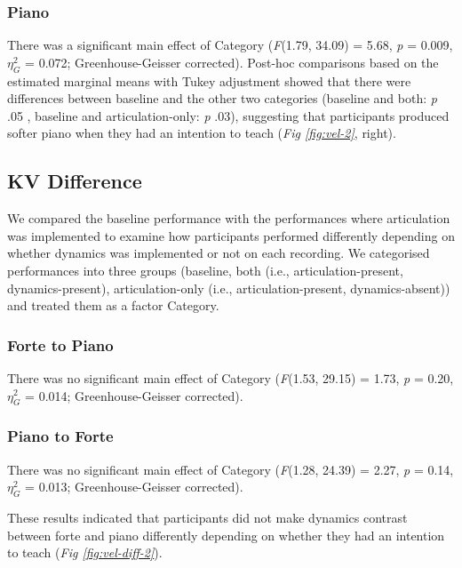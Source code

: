 \documentclass[
  man]{apa6}
\begin{document}
\hypertarget{piano-1}{%
\subsubsection{Piano}\label{piano-1}}

There was a significant main effect of Category (\emph{F}(1.79, 34.09) = 5.68, \emph{p} = 0.009, \(\eta_G^2\) = 0.072; Greenhouse-Geisser corrected). Post-hoc comparisons based on the estimated marginal means with Tukey adjustment showed that there were differences between baseline and the other two categories (baseline and both: \emph{p} .05 , baseline and articulation-only: \emph{p} .03), suggesting that participants produced softer piano when they had an intention to teach (\emph{Fig \ref{fig:vel-2}}, right).

\hypertarget{kv-difference-1}{%
\subsection{KV Difference}\label{kv-difference-1}}

We compared the baseline performance with the performances where articulation was implemented to examine how participants performed differently depending on whether dynamics was implemented or not on each recording. We categorised performances into three groups (baseline, both (i.e., articulation-present, dynamics-present), articulation-only (i.e., articulation-present, dynamics-absent)) and treated them as a factor Category.

\hypertarget{forte-to-piano-1}{%
\subsubsection{Forte to Piano}\label{forte-to-piano-1}}

There was no significant main effect of Category (\emph{F}(1.53, 29.15) = 1.73, \emph{p} = 0.20, \(\eta_G^2\) = 0.014; Greenhouse-Geisser corrected).

\hypertarget{piano-to-forte-1}{%
\subsubsection{Piano to Forte}\label{piano-to-forte-1}}

There was no significant main effect of Category (\emph{F}(1.28, 24.39) = 2.27, \emph{p} = 0.14, \(\eta_G^2\) = 0.013; Greenhouse-Geisser corrected).

These results indicated that participants did not make dynamics contrast between forte and piano differently depending on whether they had an intention to teach (\emph{Fig \ref{fig:vel-diff-2}}).
\end{document}

